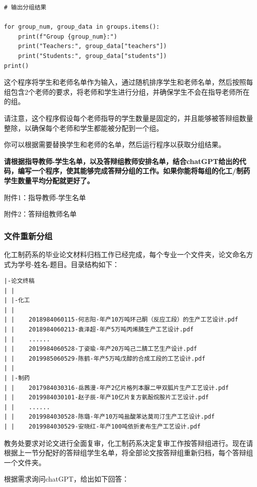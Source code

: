 \documentclass[10pt]{elegantnote}
\begin{document}
\begin{sloppypar}
\begin{lstlisting}
# 输出分组结果

for group_num, group_data in groups.items():
    print(f"Group {group_num}:")
    print("Teachers:", group_data["teachers"])
    print("Students:", group_data["students"])
print()
\end{lstlisting}

\begin{framed}
    这个程序将学生和老师名单作为输入，通过随机排序学生和老师名单，然后按照每组包含2个老师的要求，将老师和学生进行分组，并确保学生不会在指导老师所在的组。

请注意，这个程序假设每个老师指导的学生数量是固定的，并且能够被答辩组数量整除，以确保每个老师和学生都能被分配到一个组。

你可以根据需要替换学生和老师的名单，然后运行程序以获取分组结果。
\end{framed}

{\bfseries 请根据指导教师-学生名单，以及答辩组教师安排名单，结合chatGPT给出的代码，编写一个程序，使其能够完成答辩分组的工作。如果你能将每组的化工/制药学生数量平均分配就更好了。

附件1：指导教师-学生名单

附件2：答辩组教师名单}

\subsubsection{文件重新分组}

化工制药系的毕业论文材料归档工作已经完成，每个专业一个文件夹，论文命名方式为学号-姓名-题目。目录结构如下：

\begin{verbatim}
|-论文终稿
| |  
| |-化工
| |  
| |    2018984060115-何志阳-年产10万吨环己酮（反应工段）的生产工艺设计.pdf
| |    2018984060213-袁泽超-年产5万吨丙烯腈生产工艺设计.pdf
| |    ......
| |    2019984060528-丁姿瑜-年产20万吨己二腈工艺生产设计.pdf
| |    2019985060529-陈鹤-年产5万吨戊醇的合成工段的工艺设计.pdf
| |  
| |-制药
| |    2017984030316-岳茜漫-年产2亿片格列本脲二甲双胍片生产工艺设计.pdf
| |    2019984030101-赵子辰-年产10亿片复方氨酚烷胺片工艺设计.pdf
| |    ......
| |    2019984030528-陈璐-年产10万吨盐酸苯达莫司汀生产工艺设计.pdf
| |    2019984030529-安晓红-年产100吨依折麦布生产工艺设计.pdf
\end{verbatim}

教务处要求对论文进行全面复审，化工制药系决定复审工作按答辩组进行。现在请根据上一节分配好的答辩组学生名单，将全部论文按答辩组重新归档，每个答辩组一个文件夹。

根据需求询问chatGPT，给出如下回答：


\end{sloppypar}
\end{document}
